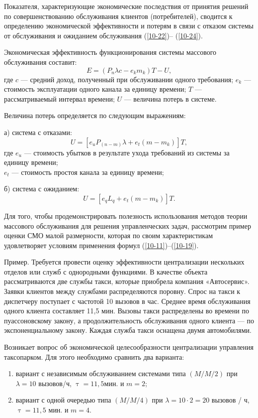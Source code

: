 Показателя, характеризующие экономические последствия от принятия решений по совершенствованию обслуживания клиентов (потребителей), сводится к определению экономической эффективности и потерям в связи с отказом системы от обслуживания и ожиданием обслуживания (\ref{10-22})-- (\ref{10-24}).

Экономическая эффективность функционирования системы массового обслуживания составит:
\begin{equation}\label{10-22}
E =(P_n\lambda c - e_k m_k)T - U,
\end{equation}
где $ c $ --- средний доход, полученный при обслуживании одного требования;
$ e_k $ --- стоимость эксплуатации одного канала за единицу времени;
$ T $ --- рассматриваемый интервал времени;
$ U $ --- величина потерь в системе.

Величина потерь определяется по следующим выражениям:

а) система с отказами:
\begin{equation}\label{10-23}
U = \left[e_u P_{(n-m)} \lambda + e_t (m - m_k)\right] T,
\end{equation}
где $ e_u $ --- стоимость убытков в результате ухода требований из системы за единицу времени;\\
$ e_t $ --- стоимость простоя канала за единицу времени;

б) система с ожиданием:
\begin{equation}\label{10-24}
U = [e_q L_q + e_t(m - m_k)] T.
\end{equation}

Для того, чтобы продемонстрировать полезность использования  методов теории массового обслуживания для решения управленческих задач, рассмотрим пример оценки СМО малой размерности, которая по своим характеристикам удовлетворяет условиям применения формул (\ref{10-11})--(\ref{10-19}).

Пример. Требуется провести оценку эффективности централизации нескольких отделов или служб с однородными функциями. В качестве объекта рассматриваются две службы такси, которые приобрела компания «Автосервис». Заявки клиентов между службами распределяются поровну. Спрос на такси к диспетчеру поступает с частотой 10 вызовов в час. Среднее время обслуживания одного клиента составляет 11,5 мин. Вызовы такси распределены во времени по пуассоновскому закону, а продолжительность обслуживания одного клиента --- по экспоненциальному закону. Каждая служба такси оснащена двумя автомобилями.

Возникает вопрос об экономической целесообразности централизации управления таксопарком. Для этого необходимо сравнить два варианта:
\begin{enumerate}
	\item вариант с независимым обслуживанием системами типа $(M/M/2)$ при $\lambda = 10$ вызовов/ч, $\uptau = 11,5$мин. и $m = 2$;
	\item вариант с одной очередью типа $(M/M/4)$ при $\lambda = 10 \cdot 2 = 20$ вызовов / ч, $\uptau = 11,5$ мин. и $m = 4$.
\end{enumerate}


